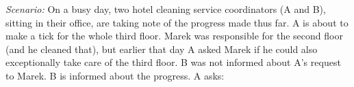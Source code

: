 \documentclass[output=paper,colorlinks,citecolor=brown]{langscibook}
\begin{document}
\eanoraggedright \textit{Scenario:} On a busy day, two hotel cleaning service coordinators (A and B), sitting in their office, are taking note of the progress made thus far. A is about to make a tick for the whole third floor. Marek was responsible for the second floor (and he cleaned that), but earlier that day A asked Marek if he could also exceptionally take care of the third floor. B was not informed about A's request to Marek. B is informed about the progress. A asks:\label{sim:ex:bias2}
\label{sim:ex:bias2b}
\label{sim:ex:bias2c}
\z\z
\end{document}

